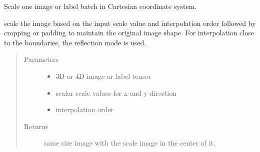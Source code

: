 \documentclass[letterpaper,10pt,english]{sphinxmanual}
\begin{document}
\begin{fulllineitems}
\label{\detokenize{index:util.load_batch.img_rand_scale}}
Scale one image or label batch in Cartesian coordinate system.

scale the image based on the input scale value and interpolation order followed by cropping or padding to
maintain the original image shape.  For interpolation close to the boundaries,  the reflection mode is used.
\begin{quote}\begin{description}
\item[{Parameters}] \leavevmode\begin{itemize}
\item {} 
 \textendash{} 3D or 4D image or label tensor

\item {} 
 \textendash{} scalar scale values for x and y direction

\item {} 
 \textendash{} interpolation order

\end{itemize}

\item[{Returns}] \leavevmode
same size image with the scale image in the center of it.

\end{description}\end{quote}

\end{fulllineitems}

\end{document}

